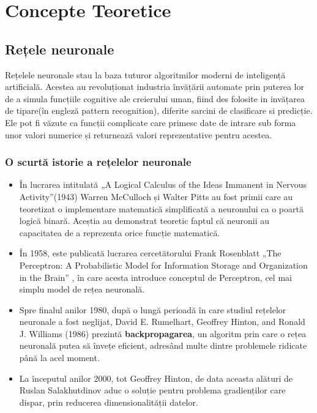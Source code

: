 \chapter{Concepte Teoretice}

\section{Rețele neuronale}

Rețelele neuronale stau la baza tuturor algoritmilor moderni de inteligență artificială. Acestea au revoluționat industria învățării automate prin puterea lor de a simula funcțiile cognitive ale creierului uman, fiind des folosite in invățarea de tipare(în engleză pattern recognition), diferite sarcini de clasificare si predicție. Ele pot fi văzute ca funcții complicate care primesc date de intrare sub forma unor valori numerice și returnează valori reprezentative pentru acestea. 

\subsection{O scurtă istorie a rețelelor neuronale}

\begin{itemize}
    \item În lucrarea intitulată „A Logical Calculus of the Ideas Immanent in Nervous Activity”(1943) \cite{mcculloch1943logical} Warren McCulloch și Walter Pitts au fost primii care au teoretizat o implementare matematică simplificată a neuronului ca o poartă logică binară. Aceștia au demonstrat teoretic faptul că neuronii au capacitatea de a reprezenta orice funcție matematică.

    \item În 1958, este publicată lucrarea cercetătorului Frank Rosenblatt „The Perceptron: A Probabilistic Model for Information Storage and Organization in the Brain” \cite{rosenblatt1958perceptron}, în care acesta introduce conceptul de Perceptron, cel mai simplu model de rețea neuronală. 

    \newpage
    
    \item Spre finalul anilor 1980, după o lungă perioadă în care studiul rețelelor neuronale a fost neglijat, David E. Rumelhart, Geoffrey Hinton, and Ronald J. Williams (1986) \cite{rumelhart1986learning} prezintă \textbf{backpropagarea}, un algoritm prin care o rețea neuronală putea să învețe eficient, adresând multe dintre problemele ridicate până la acel moment. 

    \item La începutul anilor 2000, tot Geoffrey Hinton, de data aceasta alături de Ruslan Salakhutdinov \cite{hinton2006reducing} aduc o soluție pentru problema gradienților care dispar, prin reducerea dimensionalității datelor.
\end{itemize}

